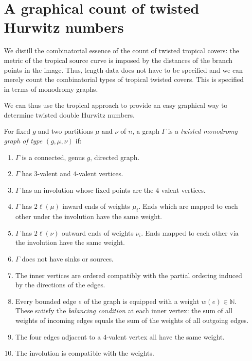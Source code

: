 \documentclass[ALCO,published]{cedram}
\begin{document}
\section{A graphical count of twisted Hurwitz numbers}
\label{sec:monodr}
We distill the combinatorial essence of the count of twisted tropical covers: the metric of the tropical source curve is imposed by the distances of the branch points in the image. Thus, length data does not have to be specified and we can merely count the combinatorial types of tropical twisted covers. This is specified in terms of monodromy graphs.

We can thus use the tropical approach to provide an easy graphical way to determine twisted double Hurwitz numbers.

\begin{defi}
\label{def-mongraph}
For fixed $g$ and two partitions $\mu$ and $\nu$ of $n$, a graph $\Gamma$ is a \emph{twisted monodromy graph of type $(g, \mu,\nu)$}  if:
\begin{enumerate}
\item $\Gamma$ is a connected, genus $g$, directed graph. 
\item $\Gamma$ has $3$-valent and $4$-valent vertices.
\item $\Gamma$ has an involution whose fixed points are the $4$-valent vertices.
\item $\Gamma$ has $2\ell(\mu)$ inward ends of weights $\mu_i$. Ends which are mapped to each other under the involution have the same weight.
\item $\Gamma$ has $2\ell(\nu)$ outward ends of weights $\nu_i$. Ends mapped to each other via the involution have the same weight.
\item $\Gamma$ does not have sinks or sources.
\item The inner vertices are ordered compatibly with the partial ordering induced by the directions of the edges.
\item Every bounded edge $e$ of the graph is equipped with a weight $w(e)\in \mathbb{N}$. These satisfy the \emph{balancing condition} at each inner vertex: the sum of all weights of  incoming  edges equals the sum of the weights of all outgoing edges.
\item The four edges adjacent to a $4$-valent vertex all have the same weight.
\item The involution is compatible with the weights.
\end{enumerate}
\end{defi}
\end{document}
